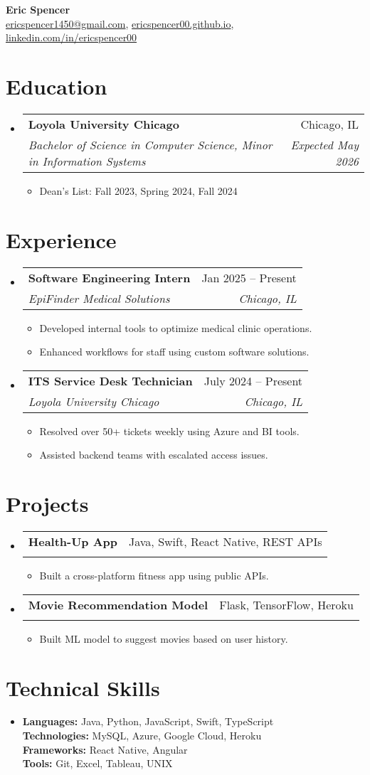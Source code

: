 \documentclass[letterpaper,11pt]{article}
\makeatletter
\newcommand{\resumeItem}[1]{\item\small{#1\vspace{-2pt}}}
\newcommand{\resumeSubheading}[4]{
  \item
    \begin{tabular*}{0.97\textwidth}[t]{l@{\extracolsep{\fill}}r}
      \textbf{#1} & #2 \\
      \textit{#3} & \textit{#4} \\
    \end{tabular*}\vspace{-7pt}
}
\newcommand{\resumeSubHeadingListStart}{\begin{itemize}[leftmargin=0.15in, label={}]}
\newcommand{\resumeSubHeadingListEnd}{\end{itemize}}
\newcommand{\resumeItemListStart}{\begin{itemize}}
\newcommand{\resumeItemListEnd}{\end{itemize}\vspace{-5pt}}
\makeatother
\begin{document}
\begin{center}
  \textbf{\Huge Eric Spencer} \\ \vspace{2pt}
  \href{mailto:ericspencer1450@gmail.com}{ericspencer1450@gmail.com}, 
  \href{https://ericspencer00.github.io}{ericspencer00.github.io}, 
  \href{https://linkedin.com/in/ericspencer00}{linkedin.com/in/ericspencer00}
\end{center}

\section{Education}
\resumeSubHeadingListStart
  \resumeSubheading
    {Loyola University Chicago}{Chicago, IL}
    {Bachelor of Science in Computer Science, Minor in Information Systems}{Expected May 2026}
    \resumeItemListStart
      \resumeItem{Dean’s List: Fall 2023, Spring 2024, Fall 2024}
    \resumeItemListEnd
\resumeSubHeadingListEnd

\section{Experience}
\resumeSubHeadingListStart
  \resumeSubheading
    {Software Engineering Intern}{Jan 2025 – Present}
    {EpiFinder Medical Solutions}{Chicago, IL}
    \resumeItemListStart
      \resumeItem{Developed internal tools to optimize medical clinic operations.}
      \resumeItem{Enhanced workflows for staff using custom software solutions.}
    \resumeItemListEnd

  \resumeSubheading
    {ITS Service Desk Technician}{July 2024 – Present}
    {Loyola University Chicago}{Chicago, IL}
    \resumeItemListStart
      \resumeItem{Resolved over 50+ tickets weekly using Azure and BI tools.}
      \resumeItem{Assisted backend teams with escalated access issues.}
    \resumeItemListEnd
\resumeSubHeadingListEnd

\section{Projects}
\resumeSubHeadingListStart
  \resumeSubheading
    {Health-Up App}{Java, Swift, React Native, REST APIs}
    {}{}
    \resumeItemListStart
      \resumeItem{Built a cross-platform fitness app using public APIs.}
    \resumeItemListEnd

  \resumeSubheading
    {Movie Recommendation Model}{Flask, TensorFlow, Heroku}
    {}{}
    \resumeItemListStart
      \resumeItem{Built ML model to suggest movies based on user history.}
    \resumeItemListEnd
\resumeSubHeadingListEnd

\section{Technical Skills}
\resumeSubHeadingListStart
  \item \textbf{Languages:} Java, Python, JavaScript, Swift, TypeScript \\
  \textbf{Technologies:} MySQL, Azure, Google Cloud, Heroku \\
  \textbf{Frameworks:} React Native, Angular \\
  \textbf{Tools:} Git, Excel, Tableau, UNIX
\resumeSubHeadingListEnd
\end{document}

